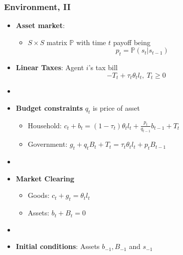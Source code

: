 \documentclass{beamer}
\begin{document}
\begin{frame}
 \frametitle{Environment, II}
 \begin{itemize}
\item \textbf{Asset market}:
\begin{itemize}
\item $S \times S$ matrix $\mathbb{P}$ with time $t$ payoff being
\[p_t=\mathbb{P}(s_{t}|s_{t-1})\]
\end{itemize}



  \item \textbf{Linear Taxes}: Agent $i$'s tax bill
\[- T_t + \tau_t \theta_{t}l_{t},  \ T_t \geq 0 \]

\item[]
  \item \textbf{Budget constraints} $q_t$ is price of  asset

  \begin{itemize}
   \item Household: $ c_{t}+b_{t}=\left( 1-\tau _{t}\right) \theta _{t}l_{t}+\frac{p_{t}}{q_{t-1}}b_{t-1}+T_{t}$ %
  \item Government: $g_{t}+q_tB_{t}+T_t=\tau _{t}\theta_{t}l_{t}+p_{t}B_{t-1} $%
  \end{itemize}

\item[]
  \item \textbf{Market Clearing}
  \begin{itemize}
   \item Goods: $c_{t}+g_t = \theta _{t} l_{t}$

   \item Assets: $b_{t}+B_{t}=0$
\end{itemize}
  \item[]

\item \textbf{Initial conditions}: Assets $b_{-1}, B_{-1}$ and  $s_{-1}$
\end{itemize}

\end{frame}
\end{document}

